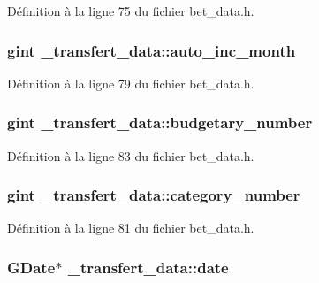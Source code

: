 Définition à la ligne 75 du fichier bet\_\-data.h.

\subsubsection[{auto\_\-inc\_\-month}]{\setlength{\rightskip}{0pt plus 5cm}gint {\bf \_\-transfert\_\-data::auto\_\-inc\_\-month}}\label{struct__transfert__data_a54e9310ec0bdddb6dd78df8d3f12c897}


Définition à la ligne 79 du fichier bet\_\-data.h.

\subsubsection[{budgetary\_\-number}]{\setlength{\rightskip}{0pt plus 5cm}gint {\bf \_\-transfert\_\-data::budgetary\_\-number}}\label{struct__transfert__data_a1401ed2c69ccc97868a64ad488215dc7}


Définition à la ligne 83 du fichier bet\_\-data.h.

\subsubsection[{category\_\-number}]{\setlength{\rightskip}{0pt plus 5cm}gint {\bf \_\-transfert\_\-data::category\_\-number}}\label{struct__transfert__data_a0f5f788e1ea93c6812e64cd5116ce0a4}


Définition à la ligne 81 du fichier bet\_\-data.h.

\subsubsection[{date}]{\setlength{\rightskip}{0pt plus 5cm}GDate$\ast$ {\bf \_\-transfert\_\-data::date}}\label{struct__transfert__data_aa0172d4a97c16d13a2138c27cb1bfbaf}


